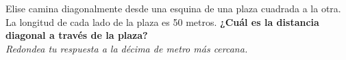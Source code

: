 Elise camina diagonalmente desde una esquina de una plaza cuadrada a la otra.
La longitud de cada lado de la plaza es 50 metros.
\textbf{¿Cuál es la distancia diagonal a través de la plaza?}\\
\textit{Redondea tu respuesta a la décima de metro más cercana.}